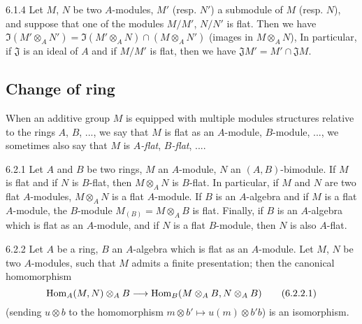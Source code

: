 \begin{env}{6.1.4}
\label{env-0.6.1.4}
Let $M$, $N$ be two $A$-modules, $M'$ (resp. $N'$) a submodule of $M$ (resp. $N$), and
suppose that one of the modules $M/M'$, $N/N'$ is flat. Then we have
$\Im(M'\otimes_A N')=\Im(M'\otimes_A N)\cap(M\otimes_A N')$ (images in $M\otimes_A N$), In
particular, if $\mathfrak{J}$ is an ideal of $A$ and if $M/M'$ is flat, then we have
$\mathfrak{J}M'=M'\cap\mathfrak{J}M$.
\end{env}

\subsection{Change of ring}
\label{0-prelim-6.2}

When an additive group $M$ is equipped with multiple modules structures relative to the
rings $A$, $B$, ..., we say that $M$ is flat as an $A$-module, $B$-module, ..., we sometimes
also say that $M$ is \emph{$A$-flat}, \emph{$B$-flat}, ....

\begin{env}{6.2.1}
\label{env-0.6.2.1}
Let $A$ and $B$ be two rings, $M$ an $A$-module, $N$ an $(A,B)$-bimodule. If $M$ is flat and
if $N$ is $B$-flat, then $M\otimes_A N$ is $B$-flat. In particular, if $M$ and $N$ are two
flat $A$-modules, $M\otimes_A N$ is a flat $A$-module. If $B$ is an $A$-algebra and if $M$ is
a flat $A$-module, the $B$-module $M_{(B)}=M\otimes_A B$ is flat. Finally, if $B$ is an
$A$-algebra which is flat as an $A$-module, and if $N$ is a flat $B$-module, then $N$ is also
$A$-flat.
\end{env}

\begin{env}{6.2.2}
\label{env-0.6.2.2}
Let $A$ be a ring, $B$ an $A$-algebra which is flat as an $A$-module. Let $M$, $N$ be two
$A$-modules, such that $M$ admits a finite presentation; then the canonical homomorphism
\[
  {\mathop{\mathrm{Hom}}\nolimits}_A(M,N)\otimes_A B\longrightarrow{\mathop{\mathrm{Hom}}\nolimits}_B(M\otimes_A B,N\otimes_A B)
  \tag{6.2.2.1}
\]
(sending $u\otimes b$ to the homomorphism $m\otimes b'\mapsto u(m)\otimes b'b$) is an
isomorphism.
\end{env}

